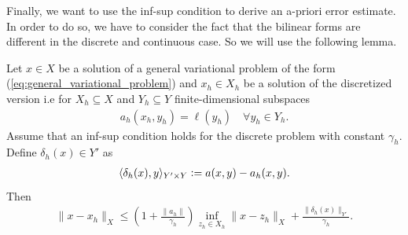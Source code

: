 \documentclass[../master_thesis.tex]{subfiles}
\begin{document}
Finally, we want to use the inf-sup condition to derive an a-priori error estimate. 
In order to do so, we have to consider the fact that the bilinear forms 
are different in the discrete and continuous case. So we will use the following lemma.
\begin{lemma}\label{lem:a_priori_estimate_from_infsup}
    Let $x \in X$ be a solution of a general variational problem of the form (\ref{eq:general_variational_problem}) 
    and $x_h \in X_h$ be a solution of the discretized version i.e for $X_h \subseteq X$ 
    and $ Y_h \subseteq Y$ finite-dimensional subspaces
    \begin{align*}
        a_h(x_h,y_h) = \ell(y_h) \quad \forall y_h \in Y_h.
    \end{align*}
    Assume that an inf-sup condition holds for the discrete problem with constant 
    $\gamma_h$.
    Define $\delta_h(x) \in Y'$ as 
    \begin{align*}
        \langle \delta_h(x), y \rangle_{Y'\times Y} 
        \vcentcolon= a(x,y) - a_h(x,y).
    \end{align*}
    Then
    \begin{align*}
        \lVert x - x_h \rVert _X 
        \leq \left( 1 + \frac{\lVert a_h \rVert}{\gamma_h} \right) 
            \inf_{z_h \in X_h} \lVert x - z_h\rVert _X + \frac{\lVert \delta_h(x) \rVert _{Y'}}{\gamma_h}.
    \end{align*}
\end{lemma}
\end{document}

